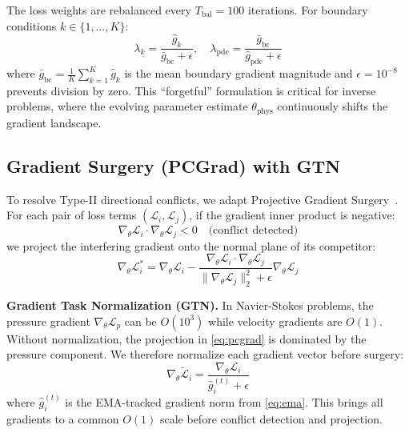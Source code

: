 \documentclass[conference]{IEEEtran}
\begin{document}
The loss weights are rebalanced every $T_{\text{bal}} = 100$ iterations. For boundary conditions $k \in \{1, \ldots, K\}$:
\begin{equation}
    \lambda_k = \frac{\hat{g}_k}{\bar{g}_{\text{bc}} + \epsilon}, \quad \lambda_{\text{pde}} = \frac{\bar{g}_{\text{bc}}}{\hat{g}_{\text{pde}} + \epsilon}
    \label{eq:weights}
\end{equation}
where $\bar{g}_{\text{bc}} = \frac{1}{K}\sum_{k=1}^{K} \hat{g}_k$ is the mean boundary gradient magnitude and $\epsilon = 10^{-8}$ prevents division by zero. This ``forgetful'' formulation is critical for inverse problems, where the evolving parameter estimate $\theta_{\text{phys}}$ continuously shifts the gradient landscape.

\subsection{Gradient Surgery (PCGrad) with GTN}
\label{sec:pcgrad}

To resolve Type-II directional conflicts, we adapt Projective Gradient Surgery~\cite{b3}. For each pair of loss terms $(\mathcal{L}_i, \mathcal{L}_j)$, if the gradient inner product is negative:
\begin{equation}
    \nabla_\theta \mathcal{L}_i \cdot \nabla_\theta \mathcal{L}_j < 0 \quad \text{(conflict detected)}
    \label{eq:conflict}
\end{equation}
we project the interfering gradient onto the normal plane of its competitor:
\begin{equation}
    \nabla_\theta \mathcal{L}_i^{*} = \nabla_\theta \mathcal{L}_i - \frac{\nabla_\theta \mathcal{L}_i \cdot \nabla_\theta \mathcal{L}_j}{\|\nabla_\theta \mathcal{L}_j\|_2^2 + \epsilon} \nabla_\theta \mathcal{L}_j
    \label{eq:pcgrad}
\end{equation}

\textbf{Gradient Task Normalization (GTN).} In Navier-Stokes problems, the pressure gradient $\nabla_\theta \mathcal{L}_p$ can be $O(10^3)$ while velocity gradients are $O(1)$. Without normalization, the projection in \cref{eq:pcgrad} is dominated by the pressure component. We therefore normalize each gradient vector before surgery:
\begin{equation}
    \nabla_\theta \tilde{\mathcal{L}}_i = \frac{\nabla_\theta \mathcal{L}_i}{\hat{g}_i^{(t)} + \epsilon}
    \label{eq:gtn}
\end{equation}
where $\hat{g}_i^{(t)}$ is the EMA-tracked gradient norm from \cref{eq:ema}. This brings all gradients to a common $O(1)$ scale before conflict detection and projection.
\end{document}
